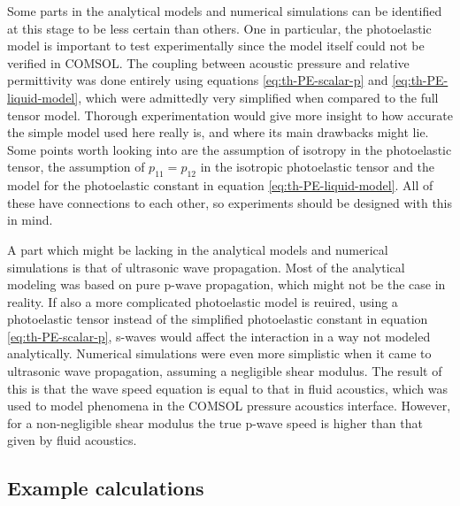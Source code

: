 \documentclass[11pt,twoside]{eitExjobb}
\begin{document}
	Some parts in the analytical models and numerical simulations can be identified at this stage to be less certain than others. One in particular, the photoelastic model is important to test experimentally since the model itself could not be verified in COMSOL. The coupling between acoustic pressure and relative permittivity was done entirely using equations \eqref{eq:th-PE-scalar-p} and \eqref{eq:th-PE-liquid-model}, which were admittedly very simplified when compared to the full tensor model. Thorough experimentation would give more insight to how accurate the simple model used here really is, and where its main drawbacks might lie. Some points worth looking into are the assumption of isotropy in the photoelastic tensor, the assumption of $p_{11} = p_{12}$ in the isotropic photoelastic tensor and the model for the photoelastic constant in equation \eqref{eq:th-PE-liquid-model}. All of these have connections to each other, so experiments should be designed with this in mind.
	
	A part which might be lacking in the analytical models and numerical simulations is that of ultrasonic wave propagation. Most of the analytical modeling was based on pure p-wave propagation, which might not be the case in reality. If also a more complicated photoelastic model is reuired, using a photoelastic tensor instead of the simplified photoelastic constant in equation \eqref{eq:th-PE-scalar-p}, s-waves would affect the interaction in a way not modeled analytically. Numerical simulations were even more simplistic when it came to ultrasonic wave propagation, assuming a negligible shear modulus. The result of this is that the wave speed equation is equal to that in fluid acoustics, which was used to model phenomena in the COMSOL pressure acoustics interface. However, for a non-negligible shear modulus the true p-wave speed is higher than that given by fluid acoustics. 
	
	\subsection{Example calculations}
	
\end{document}
